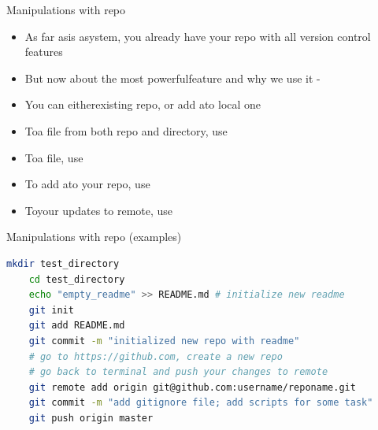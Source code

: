 \documentclass[usenames,dvipsnames,10pt,aspectratio=169]{beamer}
\begin{document}


\begin{frame}[fragile]{Manipulations with repo}
    \begin{itemize}
        \item As far asis asystem, you already have your repo with all version control features
        \item But now about the most powerfulfeature and why we use it -
        \item You can eitherexisting repo, or add ato local one
        \item Toa file from both repo and directory, use
        \item Toa file, use
        \item To add ato your repo, use
        \item Toyour updates to remote, use
    \end{itemize}
\end{frame}

\begin{frame}[fragile]{Manipulations with repo (examples)}
    \begin{lstlisting}[language=Bash, style=shellstyle] 
    mkdir test_directory
    cd test_directory
    echo "empty_readme" >> README.md # initialize new readme
    git init
    git add README.md
    git commit -m "initialized new repo with readme"
    # go to https://github.com, create a new repo
    # go back to terminal and push your changes to remote
    git remote add origin git@github.com:username/reponame.git 
    git commit -m "add gitignore file; add scripts for some task" 
    git push origin master\end{lstlisting}
\end{frame}
\end{document}
